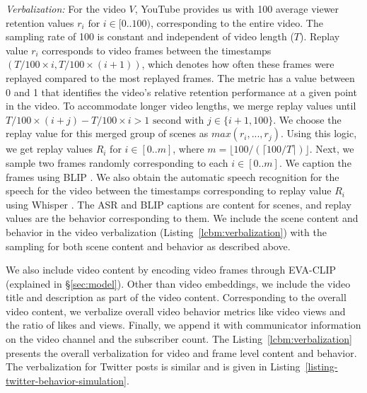 \textit{Verbalization:} For the video $V$, YouTube provides us with 100 average viewer retention values $r_i \text{ for } i\in[0..100)$, corresponding to the entire video. The sampling rate of 100 is constant and independent of video length ($T$). Replay value $r_i$ corresponds to video frames between the timestamps $(T/100\times i, T/100\times(i+1))$, which denotes how often these frames were replayed compared to the most replayed frames. The metric has a value between 0 and 1 that identifies the video's relative retention performance at a given point in the video. To accommodate longer video lengths, we merge replay values until $T/100\times(i+j)-T/100\times i > 1 \text{ second with } j\in\{i+1,100\}$. We choose the replay value for this merged group of scenes as $max(r_i,..., r_j)$. Using this logic, we get replay values $R_i$ for $i \in[0..m]$, where $m=\lfloor 100/(\lceil 100/T \rceil) \rfloor$.
Next, we sample two frames randomly corresponding to each $i \in [0..m]$. We caption the frames using BLIP \citep{li2023blip2}. We also obtain the automatic speech recognition for the speech for the video between the timestamps corresponding to replay value $R_i$ using Whisper \citep{radford2023robust}. The ASR and BLIP captions are content for scenes, and replay values are the behavior corresponding to them. We include the scene content and behavior in the video verbalization (Listing~\ref{lcbm:verbalization}) with the sampling for both scene content and behavior as described above. %

We also include video content by encoding video frames through EVA-CLIP \citep{sun2023eva} (explained in \S\ref{sec:model}). Other than video embeddings, we include the video title and description as part of the video content. Corresponding to the overall video content, we verbalize overall video behavior metrics like video views and the ratio of likes and views. Finally, we append it with communicator information on the video channel and the subscriber count. The Listing~\ref{lcbm:verbalization} presents the overall verbalization for video and frame level content and behavior. The verbalization for Twitter posts is similar and is given in Listing~\ref{listing-twitter-behavior-simulation}.

